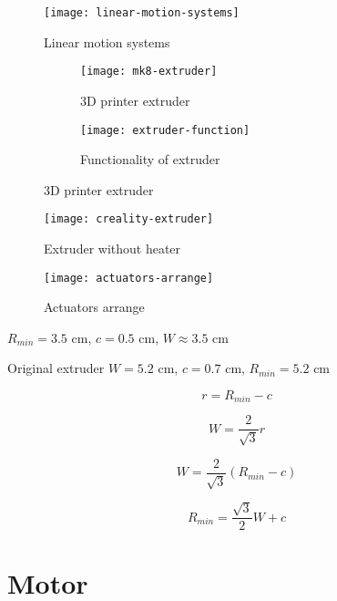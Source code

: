 \begin{figure}
    \centering
    \texttt{[image: linear-motion-systems]}
    \caption{Linear motion systems}
    \label{fig:linear-motion-systems}
\end{figure}

\begin{figure}
    \centering
    \begin{subfigure}[b]{0.4\textwidth}
        \texttt{[image: mk8-extruder]}
        \caption{3D printer extruder}
        \label{fig:mk8-extruder}
    \end{subfigure}
    \begin{subfigure}[b]{0.4\textwidth}
        \texttt{[image: extruder-function]}
        \caption{Functionality of extruder}
        \label{fig:extruder-function}
    \end{subfigure}
    \caption{3D printer extruder}
    \label{fig:extruder}
\end{figure}

\begin{figure}
    \centering
    \texttt{[image: creality-extruder]}
    \caption{Extruder without heater}
    \label{fig:extruder-wo-heater}
\end{figure}


\begin{figure}
    \centering
    \texttt{[image: actuators-arrange]}
    \caption{Actuators arrange}
    \label{fig:actuators-arrange}
\end{figure}

$R_{min}=3.5$ cm, $c=0.5$ cm, $W\approx3.5$ cm

Original extruder $W=5.2$ cm, $c=0.7$ cm, $R_{min}=5.2$ cm

\begin{equation}
    r=R_{min}-c
\end{equation}

\begin{equation}
    W=\frac{2}{\sqrt{3}}r
\end{equation}

\begin{equation}
    W=\frac{2}{\sqrt{3}}(R_{min}-c)
\end{equation}

\begin{equation}
    R_{min}=\frac{\sqrt{3}}{2}W+c
\end{equation}


\section{Motor}

